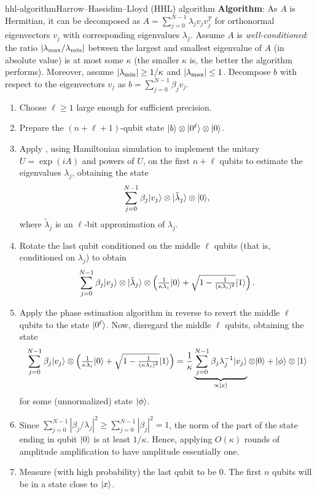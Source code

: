 \begin{topic}{hhl-algorithm}{Harrow--Hassidim--Lloyd (HHL) algorithm}
    \textbf{Algorithm}: As $A$ is Hermitian, it can be decomposed as $A = \sum_{j = 0}^{N - 1} \lambda_j v_j v_j^T$ for orthonormal eigenvectors $v_j$ with corresponding eigenvalues $\lambda_j$. Assume $A$ is \textit{well-conditioned}: the ratio $|\lambda_\textup{max} / \lambda_\textup{min}|$ between the largest and smallest eigenvalue of $A$ (in absolute value) is at most some $\kappa$ (the smaller $\kappa$ is, the better the algorithm performs). Moreover, assume $|\lambda_\textup{min}| \ge 1 / \kappa$ and $|\lambda_\textup{max}| \le 1$. Decompose $b$ with respect to the eigenvectors $v_j$ as $b = \sum_{j = 0}^{N - 1} \beta_j v_j$.
    \begin{enumerate}[label=(\arabic*)]
        \item Choose $\ell \ge 1$ large enough for sufficient precision.
        \item Prepare the $(n + \ell + 1)$-qubit state $|b\rangle \otimes |0^\ell\rangle \otimes |0\rangle$.
        \item Apply , using Hamiltonian simulation to implement the unitary $U = \exp(i A)$ and powers of $U$, on the first $n + \ell$ qubits to estimate the eigenvalues $\lambda_j$, obtaining the state
        \[ \sum_{j = 0}^{N - 1} \beta_j |v_j\rangle \otimes |\tilde{\lambda}_j\rangle \otimes |0\rangle , \]
        where $\tilde{\lambda}_j$ is an $\ell$-bit approximation of $\lambda_j$.
        \item Rotate the last qubit conditioned on the middle $\ell$ qubits (that is, conditioned on $\lambda_j$) to obtain
        \[ \sum_{j = 0}^{N - 1} \beta_j |v_j\rangle \otimes |\tilde{\lambda}_j\rangle \otimes \left( \tfrac{1}{\kappa \lambda_i} |0\rangle + \sqrt{1 - \tfrac{1}{(\kappa \lambda_i)^2}} |1\rangle \right) . \]
        \item Apply the phase estimation algorithm in reverse to revert the middle $\ell$ qubits to the state $|0^\ell\rangle$. Now, disregard the middle $\ell$ qubits, obtaining the state
        \[ \sum_{j = 0}^{N - 1} \beta_j |v_j\rangle \otimes \left( \tfrac{1}{\kappa \lambda_i} |0\rangle + \sqrt{1 - \tfrac{1}{(\kappa \lambda_i)^2}} |1\rangle \right) = \frac{1}{\kappa} \underbrace{\sum_{j = 0}^{N - 1} \beta_j \lambda_j^{-1} |v_j\rangle}_{\propto |x\rangle} \otimes |0\rangle + |\phi\rangle \otimes |1\rangle \]
        for some (unnormalized) state $|\phi\rangle$.
        \item Since $\sum_{j = 0}^{N - 1} |\beta_j / \lambda_j|^2 \ge \sum_{j = 0}^{N - 1} |\beta_j|^2 = 1$, the norm of the part of the state ending in qubit $|0\rangle$ is at least $1 / \kappa$. Hence, applying $O(\kappa)$ rounds of amplitude amplification to have amplitude essentially one.
        \item Measure (with high probability) the last qubit to be $0$. The first $n$ qubits will be in a state close to $|x\rangle$.
    \end{enumerate}
\end{topic}

